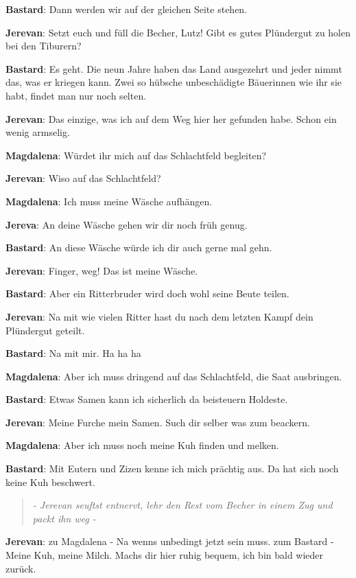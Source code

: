\documentclass[a5paper,6pt]{book}
\begin{document}
\textbf{Bastard}: Dann werden wir auf der gleichen Seite stehen.

\textbf{Jerevan}: Setzt euch und füll die Becher, Lutz!
Gibt es gutes Plündergut zu holen bei den Tiburern?

\textbf{Bastard}: Es geht. Die neun Jahre haben das Land ausgezehrt und jeder nimmt das, was er kriegen kann. Zwei so hübsche unbeschädigte Bäuerinnen wie ihr sie habt, findet man nur noch selten.

\textbf{Jerevan}: Das einzige, was ich  auf dem Weg hier her gefunden habe. Schon ein wenig armselig.

\textbf{Magdalena}: Würdet ihr mich auf das Schlachtfeld begleiten?

\textbf{Jerevan}: Wiso auf das Schlachtfeld?

\textbf{Magdalena}: Ich muss meine Wäsche aufhängen.

\textbf{Jereva}: An deine Wäsche gehen wir dir noch früh genug.

\textbf{Bastard}: An diese Wäsche würde ich dir auch gerne mal gehn.

\textbf{Jerevan}: Finger, weg! Das ist meine Wäsche.

\textbf{Bastard}: Aber ein Ritterbruder wird doch wohl seine Beute teilen.

\textbf{Jerevan}: Na mit wie vielen Ritter hast du nach dem letzten Kampf dein Plündergut geteilt.

\textbf{Bastard}: Na mit mir. Ha ha ha

\textbf{Magdalena}: Aber ich muss dringend auf das Schlachtfeld, die Saat ausbringen.

\textbf{Bastard}: Etwas Samen kann ich sicherlich da beisteuern Holdeste.

\textbf{Jerevan}: Meine Furche mein Samen. Such dir selber was zum beackern.

\textbf{Magdalena}: Aber ich muss noch meine Kuh finden und melken.

\textbf{Bastard}: Mit Eutern und Zizen kenne ich mich prächtig aus. Da hat sich noch keine Kuh beschwert.

\begin{quote}
  \textit{- Jerevan seuftst entnervt, lehr den Rest vom Becher in einem Zug und packt ihn weg -}
 \end{quote}


\textbf{Jerevan}:
zu Magdalena - Na wenns unbedingt jetzt sein muss.
zum Bastard - Meine Kuh, meine Milch. Machs dir hier ruhig bequem, ich bin bald wieder zurück.
\end{document}
